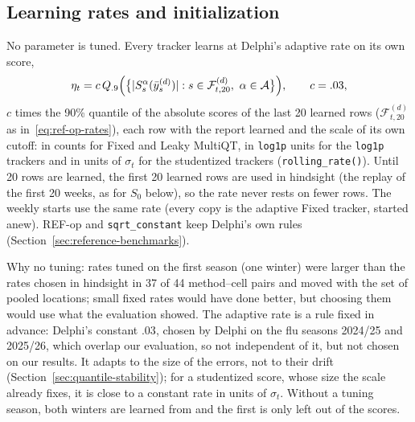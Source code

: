 \documentclass[11pt,a4paper]{article}
\newcommand{\A}{\mathcal{A}}
\theoremstyle{definition}
\theoremstyle{remark}
\begin{document}
\subsection{Learning rates and initialization}
\label{sec:tuning-initialization}
\label{sec:learning-rates}
No parameter is tuned. Every tracker learns at
Delphi's adaptive rate on its own score,
\begin{equation}
 \eta_t=c\,Q_{.9}\Bigl(\bigl\{|S_s^\alpha(\bar y_s^{(d)})|:
 s\in\mathcal F_{t,20}^{(d)},\ \alpha\in\A\bigr\}\Bigr),\qquad c=.03,
 \label{eq:adaptive-rate}
\end{equation}
$c$ times the 90\% quantile of the absolute scores of the last 20 learned
rows ($\mathcal F_{t,20}^{(d)}$ as in~\eqref{eq:ref-op-rates}), each row
with the report learned and the scale of its own cutoff: in counts for
Fixed and Leaky MultiQT, in \texttt{log1p} units for the \texttt{log1p}
trackers and in units of $\sigma_t$ for the studentized trackers
(\texttt{rolling\_rate()}). Until 20 rows are learned, the first 20
learned rows are used in hindsight (the replay of the first 20 weeks, as
for $S_0$ below), so the rate never rests on fewer rows. The weekly starts
use the same rate (every copy is the adaptive Fixed tracker, started
anew). REF-op
and \texttt{sqrt\_constant} keep Delphi's own rules
(Section~\ref{sec:reference-benchmarks}).

Why no tuning: rates tuned on the first season (one winter) were larger
than the rates chosen in hindsight in 37 of 44 method--cell pairs and
moved with the set of pooled locations; small fixed rates would have done
better, but choosing them would use what the evaluation showed. The
adaptive rate is a rule fixed in advance: Delphi's constant $.03$, chosen
by Delphi on the flu seasons 2024/25 and 2025/26, which overlap our
evaluation, so not independent of it, but not chosen on our results. It
adapts to the size of the errors, not to their drift
(Section~\ref{sec:quantile-stability}); for a studentized score, whose
size the scale already fixes, it is close to a constant rate in units of
$\sigma_t$. Without a tuning season, both winters are learned from and the
first is only left out of the scores.
\end{document}
